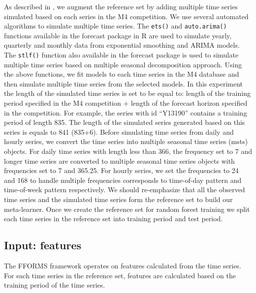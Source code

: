 \documentclass[11pt,a4paper,]{article}
\begin{document}
As described in \textcite{fforms}, we augment the reference set by adding multiple time series simulated based on each series in the M4 competition. We use several automated algorithms to simulate multiple time series. The \texttt{ets()} and \texttt{auto.arima()} functions available in the forecast package in R \autocite{forecast} are used to simulate yearly, quarterly and monthly data from exponential smoothing and ARIMA models. The \texttt{stlf()} function also available in the forecast package is used to simulate multiple time series based on multiple seasonal decomposition approach. Using the above functions, we fit models to each time series in the M4 database and then simulate multiple time series from the selected models. In this experiment the length of the simulated time series is set to be equal to: length of the training
period specified in the M4 competition + length of the forecast horizon specified in the competition. For example, the series with id ``Y13190'' contains a training period of length 835. The length of the simulated series generated based on this series is equals to 841 (835+6). Before simulating time series from daily and hourly series, we convert the time series into multiple seasonal time series (msts) objects. For daily time series with length less than 366, the frequency set to 7 and longer time series are converted to multiple seasonal time series objects with frequencies set to 7 and 365.25. For hourly series, we set the frequencies to 24 and 168 to handle multiple frequencies corresponds to time-of-day pattern and time-of-week pattern respectively. We should re-emphasize that all the observed time series and the simulated time series form the reference set to build our meta-learner. Once we create the reference set for random forest training we split each time series in the reference set into training period and test period.

\hypertarget{input-features}{%
\subsection{Input: features}\label{input-features}}

The FFORMS framework operates on features calculated from the time series. For each time series in the reference set, features are calculated based on the training period of the time series.
\end{document}
